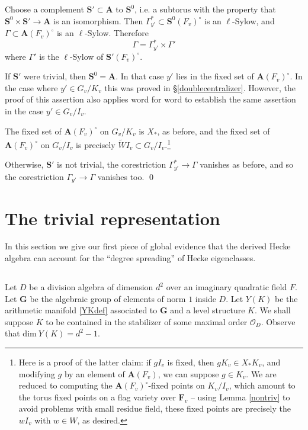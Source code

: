 \documentclass[10pt]{amsart}
\renewcommand{\dim}{\mathrm{dim}}
\theoremstyle{remark}
\newcommand{\GG}{\mathbf{G}}
\begin{document}
Choose a complement $\mathbf{S}' \subset \mathbf{A}$ to $\mathbf{S}^0$, i.e. a subtorus
with the property that $\mathbf{S}^0 \times \mathbf{S}' \rightarrow \mathbf{A}$ is an isomorphism.  
Then $\Gamma_{y'}^* \subset \mathbf{S}^0(F_v)^{\circ}$ is an $\ell$-Sylow,
and $\Gamma \subset \mathbf{A}(F_v)^{\circ}$ is an $\ell$-Sylow. 
Therefore $$\Gamma = \Gamma_{y'}^* \times \Gamma'$$
where $\Gamma'$ is the $\ell$-Sylow of $\mathbf{S}'(F_v)^{\circ}$. 

If $\mathbf{S}'$ were trivial, then $\mathbf{S}^0 = \mathbf{A}$.
In that case  $y'$ lies in the fixed set of $\mathbf{A}(F_v)^{\circ}$. 
In the case where $y' \in G_v/K_v$ this was proved in
  \S \ref{doublecentralizer}. However, the proof of this assertion also applies word for word
to establish the same assertion in the case $y' \in G_v/I_v$. 
 
The fixed set of  $\mathbf{A}(F_v)^{\circ}$
 on $G_v/K_v$ is $X_*$, as before, and the fixed set  of  $\mathbf{A}(F_v)^{\circ}$
on $G_v/I_v$ is precisely $\tilde{W} I_v \subset G_v/I_v$.\footnote{Here is a proof of the latter claim: 
if $gI_v$ is fixed, then   $g K_v \in X_* K_v$, and modifying $g$ by an element
of $\mathbf{A}(F_v)$, we can suppose $g \in K_v$. We are reduced to computing
the $\mathbf{A}(F_v)^{\circ}$-fixed points on $K_v/I_v$, which amount to the torus fixed points on a flag variety over $\mathbf{F}_v$ --
using Lemma \ref{nontriv} to avoid problems with small residue field, these fixed points are precisely the $wI_v$ with $w \in W$, as desired.}

 
Otherwise, $\mathbf{S}'$ is not trivial, the corestriction $\Gamma_{y'}^* \rightarrow \Gamma$
vanishes as before, and so the corestriction $\Gamma_{y'} \rightarrow \Gamma$ vanishes too. 
 \qed 

%
%
%
%
%
%
%
%
%
%
%
%
%
%
%
%
%
%
%
%
%
%

 
%
%
%
%
%
%
%
%
%
%
%
%
%
%
%



\section{The trivial representation} \label{Quillen}

 
 
 In this section we give our first piece of global evidence that the derived Hecke algebra
 can account for the ``degree spreading'' of Hecke eigenclasses.
 
 
 \subsection{} 
Let $D$ be a division algebra of dimension $d^2$ over an imaginary quadratic field $F$.
Let $\GG$ be the algebraic group of elements of norm $1$ inside $D$. 
Let $Y(K)$ be the arithmetic manifold \eqref{YKdef}  associated to $\GG$ and a level structure $K$.
We shall suppose  $K$ to be contained in the stabilizer of some maximal order $\mathcal{O}_D$. 
Observe that $\dim \  Y(K) = d^2-1$. 
 
\end{document}
